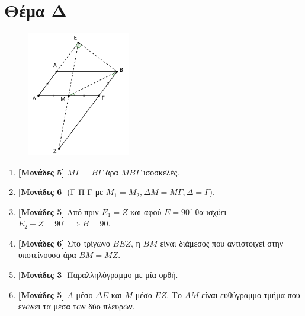 \documentclass[12pt]{article}
\begin{document}
\section*{Θέμα Δ}
  \noindent
  \begin{figure}
    \centering
    \vspace{-50pt}
    \includegraphics[width=0.4\textwidth]{2017AGeo4}
  \end{figure}
  \begin{enumerate}
    \item \textbf{[Μονάδες 5]}  $ΜΓ=ΒΓ$ άρα $ΜΒΓ$ ισοσκελές.
    \item \textbf{[Μονάδες 6]}  (Γ-Π-Γ με $Μ_1=Μ_2,ΔΜ=ΜΓ,Δ=Γ$).
    \item \textbf{[Μονάδες 5]}  Από πριν $Ε_1=Ζ$ και αφού $Ε=90^{\circ}$ θα ισχύει $E_2+Z=90^{\circ} \implies Β=90$.
    \item \textbf{[Μονάδες 6]}  Στο τρίγωνο $ΒΕΖ$, η $ΒΜ$ είναι διάμεσος που αντιστοιχεί στην υποτείνουσα άρα $ΒΜ=ΜΖ$.
    \item \textbf{[Μονάδες 3]}  Παραλληλόγραμμο με μία ορθή.
    \item \textbf{[Μονάδες 5]}  $Α$ μέσο $ΔΕ$ και $Μ$ μέσο $ΕΖ$. Το $ΑΜ$ είναι ευθύγραμμο τμήμα που ενώνει τα μέσα των δύο πλευρών.
  \end{enumerate}
\end{document}
